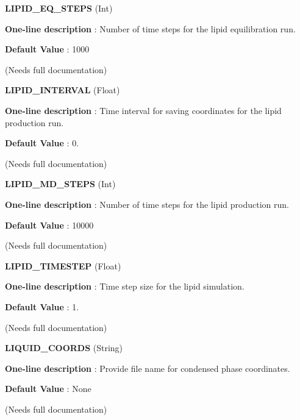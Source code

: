 \begin{DoxyItemize}
\item {\bfseries  L\-I\-P\-I\-D\-\_\-\-E\-Q\-\_\-\-S\-T\-E\-P\-S } (Int) \par
{\bfseries  One-\/line description }\-: Number of time steps for the lipid equilibration run. \par
{\bfseries  Default Value }\-: 1000 \par
(Needs full documentation)\end{DoxyItemize}
\begin{DoxyItemize}
\item {\bfseries  L\-I\-P\-I\-D\-\_\-\-I\-N\-T\-E\-R\-V\-A\-L } (Float) \par
{\bfseries  One-\/line description }\-: Time interval for saving coordinates for the lipid production run. \par
{\bfseries  Default Value }\-: 0. \par
(Needs full documentation)\end{DoxyItemize}
\begin{DoxyItemize}
\item {\bfseries  L\-I\-P\-I\-D\-\_\-\-M\-D\-\_\-\-S\-T\-E\-P\-S } (Int) \par
{\bfseries  One-\/line description }\-: Number of time steps for the lipid production run. \par
{\bfseries  Default Value }\-: 10000 \par
(Needs full documentation)\end{DoxyItemize}
\begin{DoxyItemize}
\item {\bfseries  L\-I\-P\-I\-D\-\_\-\-T\-I\-M\-E\-S\-T\-E\-P } (Float) \par
{\bfseries  One-\/line description }\-: Time step size for the lipid simulation. \par
{\bfseries  Default Value }\-: 1. \par
(Needs full documentation)\end{DoxyItemize}
\begin{DoxyItemize}
\item {\bfseries  L\-I\-Q\-U\-I\-D\-\_\-\-C\-O\-O\-R\-D\-S } (String) \par
{\bfseries  One-\/line description }\-: Provide file name for condensed phase coordinates. \par
{\bfseries  Default Value }\-: None \par
(Needs full documentation)\end{DoxyItemize}
